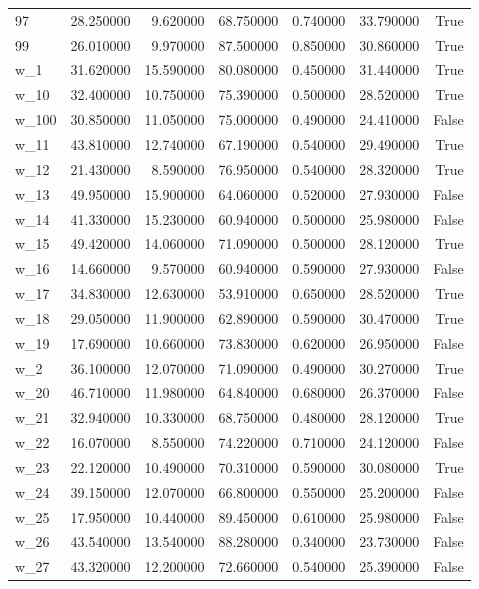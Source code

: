 \begin{table}
\begin{tabular}{lrrrrrr}
97 & 28.250000 & 9.620000 & 68.750000 & 0.740000 & 33.790000 & True \\
99 & 26.010000 & 9.970000 & 87.500000 & 0.850000 & 30.860000 & True \\
w\_1 & 31.620000 & 15.590000 & 80.080000 & 0.450000 & 31.440000 & True \\
w\_10 & 32.400000 & 10.750000 & 75.390000 & 0.500000 & 28.520000 & True \\
w\_100 & 30.850000 & 11.050000 & 75.000000 & 0.490000 & 24.410000 & False \\
w\_11 & 43.810000 & 12.740000 & 67.190000 & 0.540000 & 29.490000 & True \\
w\_12 & 21.430000 & 8.590000 & 76.950000 & 0.540000 & 28.320000 & True \\
w\_13 & 49.950000 & 15.900000 & 64.060000 & 0.520000 & 27.930000 & False \\
w\_14 & 41.330000 & 15.230000 & 60.940000 & 0.500000 & 25.980000 & False \\
w\_15 & 49.420000 & 14.060000 & 71.090000 & 0.500000 & 28.120000 & True \\
w\_16 & 14.660000 & 9.570000 & 60.940000 & 0.590000 & 27.930000 & False \\
w\_17 & 34.830000 & 12.630000 & 53.910000 & 0.650000 & 28.520000 & True \\
w\_18 & 29.050000 & 11.900000 & 62.890000 & 0.590000 & 30.470000 & True \\
w\_19 & 17.690000 & 10.660000 & 73.830000 & 0.620000 & 26.950000 & False \\
w\_2 & 36.100000 & 12.070000 & 71.090000 & 0.490000 & 30.270000 & True \\
w\_20 & 46.710000 & 11.980000 & 64.840000 & 0.680000 & 26.370000 & False \\
w\_21 & 32.940000 & 10.330000 & 68.750000 & 0.480000 & 28.120000 & True \\
w\_22 & 16.070000 & 8.550000 & 74.220000 & 0.710000 & 24.120000 & False \\
w\_23 & 22.120000 & 10.490000 & 70.310000 & 0.590000 & 30.080000 & True \\
w\_24 & 39.150000 & 12.070000 & 66.800000 & 0.550000 & 25.200000 & False \\
w\_25 & 17.950000 & 10.440000 & 89.450000 & 0.610000 & 25.980000 & False \\
w\_26 & 43.540000 & 13.540000 & 88.280000 & 0.340000 & 23.730000 & False \\
w\_27 & 43.320000 & 12.200000 & 72.660000 & 0.540000 & 25.390000 & False \\

\end{tabular}
\end{table}
